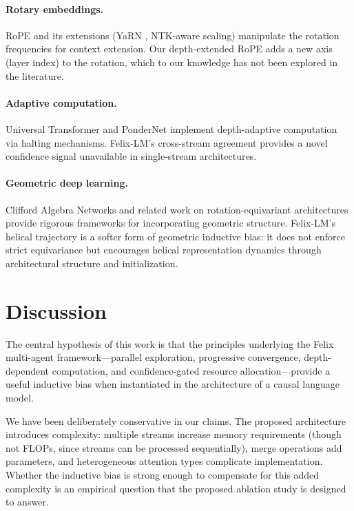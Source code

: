 \documentclass[11pt,a4paper]{article}
\theoremstyle{definition}
\theoremstyle{plain}
\theoremstyle{remark}
\begin{document}
\paragraph{Rotary embeddings.}
RoPE \cite{su2021roformer} and its extensions (YaRN 
\cite{peng2023yarn}, NTK-aware scaling) manipulate the rotation 
frequencies for context extension. Our depth-extended RoPE adds a new 
axis (layer index) to the rotation, which to our knowledge has not been 
explored in the literature.

\paragraph{Adaptive computation.}
Universal Transformer \cite{dehghani2019universal} and PonderNet 
\cite{banino2021pondernet} implement depth-adaptive computation via 
halting mechanisms. Felix-LM's cross-stream agreement provides a novel 
confidence signal unavailable in single-stream architectures.

\paragraph{Geometric deep learning.}
Clifford Algebra Networks \cite{ruhe2023geometric} and related work on 
rotation-equivariant architectures \cite{thomas2018tensor, 
fuchs2020se3transformers} provide rigorous frameworks for incorporating 
geometric structure. Felix-LM's helical trajectory is a softer form of 
geometric inductive bias: it does not enforce strict equivariance but 
encourages helical representation dynamics through architectural structure 
and initialization.

\section{Discussion}\label{sec:discussion}

The central hypothesis of this work is that the principles underlying the 
Felix multi-agent framework---parallel exploration, progressive 
convergence, depth-dependent computation, and confidence-gated resource 
allocation---provide a useful inductive bias when instantiated in the 
architecture of a causal language model.

We have been deliberately conservative in our claims. The proposed 
architecture introduces complexity: multiple streams increase memory 
requirements (though not FLOPs, since streams can be processed 
sequentially), merge operations add parameters, and heterogeneous attention 
types complicate implementation. Whether the inductive bias is strong 
enough to compensate for this added complexity is an empirical question 
that the proposed ablation study is designed to answer.
\end{document}
